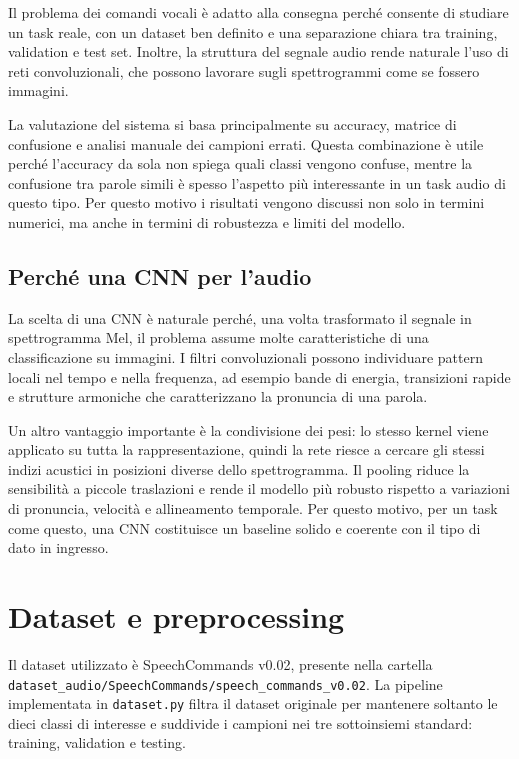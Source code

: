 \documentclass[a4paper,12pt]{article}
\begin{document}
Il problema dei comandi vocali è adatto alla consegna perché consente di studiare un task reale, con un dataset ben definito e una separazione chiara tra training, validation e test set. Inoltre, la struttura del segnale audio rende naturale l'uso di reti convoluzionali, che possono lavorare sugli spettrogrammi come se fossero immagini.

La valutazione del sistema si basa principalmente su accuracy, matrice di confusione e analisi manuale dei campioni errati. Questa combinazione è utile perché l'accuracy da sola non spiega quali classi vengono confuse, mentre la confusione tra parole simili è spesso l'aspetto più interessante in un task audio di questo tipo. Per questo motivo i risultati vengono discussi non solo in termini numerici, ma anche in termini di robustezza e limiti del modello.

\subsection{Perché una CNN per l'audio}

La scelta di una CNN è naturale perché, una volta trasformato il segnale in spettrogramma Mel, il problema assume molte caratteristiche di una classificazione su immagini. I filtri convoluzionali possono individuare pattern locali nel tempo e nella frequenza, ad esempio bande di energia, transizioni rapide e strutture armoniche che caratterizzano la pronuncia di una parola.

Un altro vantaggio importante è la condivisione dei pesi: lo stesso kernel viene applicato su tutta la rappresentazione, quindi la rete riesce a cercare gli stessi indizi acustici in posizioni diverse dello spettrogramma. Il pooling riduce la sensibilità a piccole traslazioni e rende il modello più robusto rispetto a variazioni di pronuncia, velocità e allineamento temporale. Per questo motivo, per un task come questo, una CNN costituisce un baseline solido e coerente con il tipo di dato in ingresso.

\section{Dataset e preprocessing}

Il dataset utilizzato è SpeechCommands v0.02, presente nella cartella \texttt{dataset\_audio/SpeechCommands/speech\_commands\_v0.02}. La pipeline implementata in \texttt{dataset.py} filtra il dataset originale per mantenere soltanto le dieci classi di interesse e suddivide i campioni nei tre sottoinsiemi standard: training, validation e testing.
\end{document}
